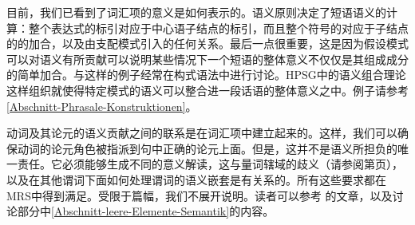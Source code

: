 目前，我们已看到了词汇项的意义是如何表示的。语义原则决定了短语语义的计算：整个表达式的标引对应于中心语子结点的标引，而且整个符号的\relsvc 对应于子结点的\relsvc 的加合，以及由支配模式引入的任何关系。最后一点很重要，这是因为假设模式可以对语义有所贡献可以说明某些情况下一个短语的整体意义不仅仅是其组成成分的简单加合。与这样的例子经常在构式语法中进行讨论\indexcxgc。HPSG中的语义组合理论这样组织就使得特定模式的语义可以整合进一段话语的整体意义之中。例子请参考\ref{Abschnitt-Phrasale-Konstruktionen}。

动词及其论元的语义贡献之间的联系是在词汇项中建立起来的。这样，我们可以确保动词的论元角色被指派到句中正确的论元上面。但是，这并不是语义所担负的唯一责任。它必须能够生成不同的意义解读，这与量词辖域的歧义（请参阅第\pageref{Beispiel-Every-man-loves-a-woman}页），以及在其他谓词下面如何处理谓词的语义嵌套是有关系的。所有这些要求都在MRS中得到满足。受限于篇幅，我们不展开说明。读者可以参考 \citet*{CFPS2005a}的文章，以及讨论部分中\ref{Abschnitt-leere-Elemente-Semantik}的内容。

